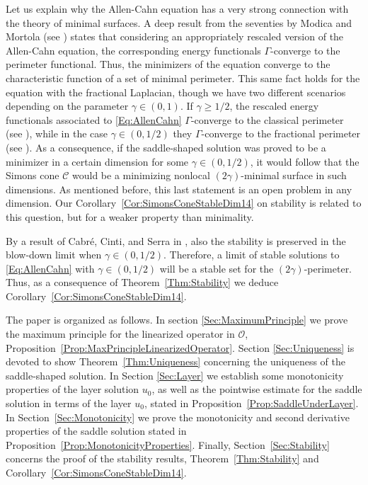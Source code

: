 \documentclass[12pt,reqno]{amsart}
\theoremstyle{definition}
\theoremstyle{remark}
\newcommand{\ccal}{\mathscr{C}}
\newcommand{\ocal}{\mathcal{O}}
\newcommand{\s}{\gamma}
\numberwithin{equation}{section}
\begin{document}
Let us explain why the Allen-Cahn equation has a very strong connection with the theory of minimal surfaces. A deep result from the seventies by Modica and Mortola (see \cite{Modica,ModicaMortola}) states that considering an appropriately rescaled version of the Allen-Cahn equation, the corresponding energy functionals $\Gamma$-converge to the perimeter functional. Thus, the minimizers of the equation converge to the characteristic function of a set of minimal perimeter. This same fact holds for the equation with the fractional Laplacian, though we have two different scenarios depending on the parameter $\s \in (0,1)$. If $\s \geq 1/2$, the rescaled energy functionals associated to \eqref{Eq:AllenCahn} $\Gamma$-converge to the classical perimeter (see \cite{GiovanniBouchitteSeppecher,Gonzalez}), while in the case $\s \in (0,1/2)$ they $\Gamma$-converge to the fractional perimeter (see \cite{SavinValdinoci-GammaConvergence}). As a consequence, if the saddle-shaped solution was proved to be a minimizer in a certain dimension for some $\s \in (0,1/2)$, it would follow that the Simons cone $\ccal$ would be a minimizing nonlocal $(2\s)$-minimal surface in such dimensions. As mentioned before, this last statement is an open problem in any dimension. Our Corollary~\ref{Cor:SimonsConeStableDim14} on stability is related to this question, but for a weaker property than minimality.

By a result of Cabré, Cinti, and Serra in \cite{CabreCintiSerra-Stable}, also the stability is preserved in the blow-down limit when $\s\in(0,1/2)$. Therefore, a limit of stable solutions to \eqref{Eq:AllenCahn} with $\s \in (0,1/2)$ will be a stable set for the $(2\s)$-perimeter. Thus, as a consequence of Theorem~\ref{Thm:Stability} we deduce Corollary~\ref{Cor:SimonsConeStableDim14}.

The paper is organized as follows. In section \ref{Sec:MaximumPrinciple} we prove the maximum principle for the linearized operator in $\ocal$, Proposition~\ref{Prop:MaxPrincipleLinearizedOperator}. Section \ref{Sec:Uniqueness} is devoted to show Theorem~\ref{Thm:Uniqueness} concerning the uniqueness of the saddle-shaped solution. In Section \ref{Sec:Layer} we establish some monotonicity properties of the layer solution $u_0$, as well as the pointwise estimate for the saddle solution in terms of the layer $u_0$, stated in Proposition~\ref{Prop:SaddleUnderLayer}. In Section~\ref{Sec:Monotonicity} we prove the monotonicity and second derivative properties of the saddle solution stated in Proposition~\ref{Prop:MonotonicityProperties}. Finally, Section~\ref{Sec:Stability} concerns the proof of the stability results, Theorem~\ref{Thm:Stability} and  Corollary~\ref{Cor:SimonsConeStableDim14}.
\end{document}

